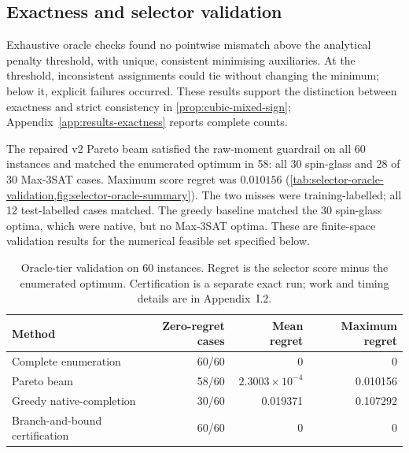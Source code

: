 \documentclass[a4paper,onecolumn,11pt,unpublished]{quantumarticle}
\theoremstyle{remark}
\begin{document}
\subsection{Exactness and selector validation}
\label{sec:results-exactness}
\label{sec:results-selector-validation}

Exhaustive oracle checks found no pointwise mismatch above the analytical
penalty threshold, with unique, consistent minimising auxiliaries. At the
threshold, inconsistent assignments could tie without changing the minimum;
below it, explicit failures occurred. These results support the distinction
between exactness and strict consistency in
\cref{prop:cubic-mixed-sign}; Appendix~\ref{app:results-exactness}
reports complete counts.

The repaired v2 Pareto beam satisfied the raw-moment guardrail on all 60
instances and matched the enumerated optimum in 58: all 30 spin-glass and
28 of 30 Max-3SAT cases. Maximum score regret was $0.010156$
(\cref{tab:selector-oracle-validation,fig:selector-oracle-summary}). The two
misses were training-labelled; all 12 test-labelled cases matched. The greedy
baseline matched the 30 spin-glass optima, which were native, but no Max-3SAT
optima. These are finite-space validation results for the numerical feasible set specified below.

\begin{table}[!htbp]
\centering
\small
\caption{Oracle-tier validation on 60 instances. Regret is the selector
score minus the enumerated optimum. Certification is a separate exact run;
work and timing details are in Appendix~I.2.}
\label{tab:selector-oracle-validation}
\begin{tabular}{@{}lrrr@{}}
\toprule
Method & Zero-regret cases & Mean regret & Maximum regret\\
\midrule
Complete enumeration & 60/60 & 0 & 0\\
Pareto beam & 58/60 & $2.3003\times10^{-4}$ & 0.010156\\
Greedy native-completion & 30/60 & 0.019371 & 0.107292\\
Branch-and-bound certification & 60/60 & 0 & 0\\
\bottomrule
\end{tabular}

\end{table}
\end{document}
